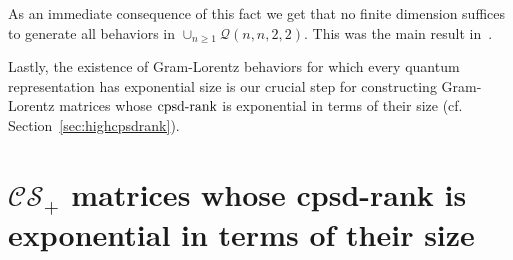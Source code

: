 \documentclass{siamart}
\begin{document}
{{As an immediate  consequence of this fact  we  get that no finite dimension suffices to generate all    behaviors  in $\cup_{n\ge 1} {\mathcal{Q}}(n,n,2,2)$.  This  was   the main result  in~\cite{VP09}.

Lastly, the existence  of  Gram-Lorentz  behaviors  for which every quantum representation has exponential size is {our} crucial step for constructing Gram-Lorentz matrices whose ${\mathrm{cpsd}\textnormal{-rank}}$ is exponential in terms of their size (cf. Section~\ref{sec:highcpsdrank}).

\section{${\mathcal{CS}_+}$ matrices whose cpsd-rank is exponential in terms of their size}\label{sec:explowerbounds}

}}
\end{document}
